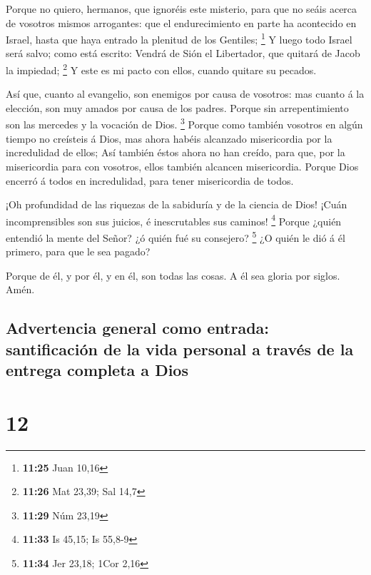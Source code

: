  Porque no quiero, hermanos, que ignoréis este misterio,
para que no seáis acerca de vosotros mismos arrogantes: que el
endurecimiento en parte ha acontecido en Israel, hasta que haya entrado
la plenitud de los Gentiles; \footnote{\textbf{11:25} Juan 10,16}
 Y luego todo Israel será salvo; como está escrito: Vendrá
de Sión el Libertador, que quitará de Jacob la impiedad; \footnote{\textbf{11:26}
  Mat 23,39; Sal 14,7}  Y este es mi pacto con ellos,
cuando quitare su pecados.

 Así que, cuanto al evangelio, son enemigos por causa de
vosotros: mas cuanto á la elección, son muy amados por causa de los
padres.  Porque sin arrepentimiento son las mercedes y la
vocación de Dios. \footnote{\textbf{11:29} Núm 23,19} 
Porque como también vosotros en algún tiempo no creísteis á Dios, mas
ahora habéis alcanzado misericordia por la incredulidad de ellos;
 Así también éstos ahora no han creído, para que, por la
misericordia para con vosotros, ellos también alcancen misericordia.
 Porque Dios encerró á todos en incredulidad, para tener
misericordia de todos.

 ¡Oh profundidad de las riquezas de la sabiduría y de la
ciencia de Dios! ¡Cuán incomprensibles son sus juicios, é inescrutables
sus caminos! \footnote{\textbf{11:33} Is 45,15; Is 55,8-9} 
Porque ¿quién entendió la mente del Señor? ¿ó quién fué su consejero?
\footnote{\textbf{11:34} Jer 23,18; 1Cor 2,16}  ¿O quién le
dió á él primero, para que le sea pagado?

 Porque de él, y por él, y en él, son todas las cosas. A él
sea gloria por siglos. Amén.

\hypertarget{advertencia-general-como-entrada-santificaciuxf3n-de-la-vida-personal-a-travuxe9s-de-la-entrega-completa-a-dios}{%
\subsection{Advertencia general como entrada: santificación de la vida
personal a través de la entrega completa a
Dios}\label{advertencia-general-como-entrada-santificaciuxf3n-de-la-vida-personal-a-travuxe9s-de-la-entrega-completa-a-dios}}

\hypertarget{section-11}{%
\section{12}\label{section-11}}


